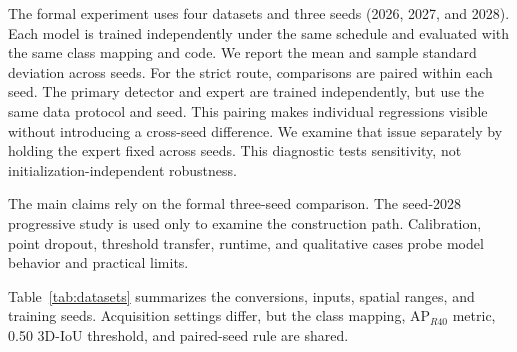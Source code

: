 \documentclass[sensors,article,submit,pdftex,moreauthors]{Definitions/mdpi}
\providecommand{\tabref}[1]{}
\renewcommand{\tabref}[1]{\textcolor{floatreviewblue}{Table~\ref{#1}}}
\renewcommand{\tabref}[1]{Table~\ref{#1}}
\begin{document}
The formal experiment uses four datasets and three seeds (2026, 2027, and
2028). Each model is trained independently under the same schedule and
evaluated with the same class mapping and code. We report the mean and sample
standard deviation across seeds. For the strict route, comparisons are paired
within each seed. The primary detector and expert are trained independently,
but use the same data protocol and seed. This pairing makes individual
regressions visible without introducing a cross-seed difference. We examine
that issue separately by holding the expert fixed across seeds. This diagnostic
tests sensitivity, not initialization-independent robustness.

The main claims rely on the formal three-seed comparison. The seed-2028
progressive study is used only to examine the construction path. Calibration,
point dropout, threshold transfer, runtime, and qualitative cases probe model
behavior and practical limits.

\tabref{tab:datasets} summarizes the conversions, inputs, spatial ranges, and
training seeds. Acquisition settings differ, but the class mapping,
AP$_{R40}$ metric, 0.50 3D-IoU threshold, and paired-seed rule are shared.
\end{document}
